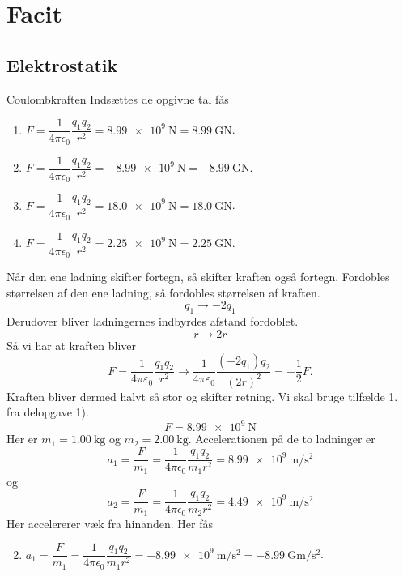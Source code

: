 \section{Facit}

\setcounter{opgave}{0}

\subsection*{Elektrostatik}

\begin{opgave}{Coulombkraften}
    \opg Indsættes de opgivne tal fås
    \begin{enumerate}
        \item $F = \dfrac{1}{4\pi\epsilon_0}\dfrac{q_1q_2}{r^2} = \SI{8.99e9}{\newton} = \SI{8.99}{\giga\newton}$.
        \item $F = \dfrac{1}{4\pi\epsilon_0}\dfrac{q_1q_2}{r^2} = -\SI{8.99e9}{\newton} = -\SI{8.99}{\giga\newton}$.
        \item $F = \dfrac{1}{4\pi\epsilon_0}\dfrac{q_1q_2}{r^2} = \SI{18.0e9}{\newton} = \SI{18.0}{\giga\newton}$.
        \item $F = \dfrac{1}{4\pi\epsilon_0}\dfrac{q_1q_2}{r^2} = \SI{2.25e9}{\newton} = \SI{2.25}{\giga\newton}$.
    \end{enumerate}
    \[ \]
    \opg Når den ene ladning skifter fortegn, så skifter kraften også fortegn. Fordobles størrelsen af den ene ladning, så fordobles størrelsen af kraften.
    \[ q_1\to -2q_1 \]
    Derudover bliver ladningernes indbyrdes afstand fordoblet.
    \[ r\to 2r\]
    Så vi har at kraften bliver
    \[ F=\frac{1}{4\pi\varepsilon_0}\frac{q_1q_2}{r^2}\to\frac{1}{4\pi\varepsilon_0}\frac{(-2q_1)q_2}{(2r)^2}=-\frac{1}{2}F.\]
    Kraften bliver dermed halvt så stor og skifter retning.
    \opg Vi skal bruge tilfælde 1. fra delopgave 1).
    \[ F=\SI{8.99e9}{\newton} \]
    Her er $m_1=\SI{1.00}{\kilo\gram}$ og $m_2=\SI{2.00}{\kilo\gram}$.
    Accelerationen på de to ladninger er
    \[ a_1 = \dfrac{F}{m_1} = \dfrac{1}{4\pi\epsilon_0}\dfrac{q_1q_2}{m_1r^2} = \SI{8.99e9}{\metre\per\second\squared} \]
    og
    \[ a_2 = \dfrac{F}{m_1} = \dfrac{1}{4\pi\epsilon_0}\dfrac{q_1q_2}{m_2r^2} = \SI{4.49e9}{\metre\per\second\squared}\]
    Her accelererer væk fra hinanden.
    \opg Her fås
    \begin{enumerate}
        \setcounter{enumi}{1}
        \item $a_1 = \dfrac{F}{m_1} = \dfrac{1}{4\pi\epsilon_0}\dfrac{q_1q_2}{m_1r^2} = -\SI{8.99e9}{\metre\per\second\squared} = -\SI{8.99}{\giga\metre\per\second\squared}$.

\end{enumerate}
\end{opgave}

